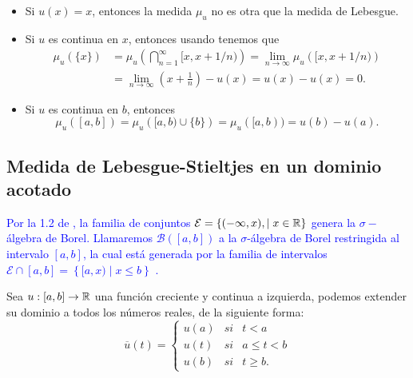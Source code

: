 %

\begin{obs} \vphantom{a}
	\begin{itemize} 
		\item Si $u(x)=x$, entonces la medida $\mu_{u}$ no es otra que la medida de Lebesgue.
		\item Si $u$ es continua   en $x$, entonces usando  \cite[Teorema 3.28]{Zo} tenemos que 		
		\begin{equation*}
            \begin{split}
			\mu_{u}(\{x\})&=\mu_{u}\left( \bigcap_{n=1}^{\infty}[x,x+1/n)\right) =\lim_{n \to \infty}\mu_{u}\left([x,x+1/n)\right)
			\\ &=\lim_{n \to \infty}\left(x+\frac{1}{n}\right)-u(x)=u(x)-u(x)=0.
            \end{split}
		\end{equation*}
		
		\item  Si $u$ es continua  en $b$, entonces 
		$$\mu_{u}([a,b])=\mu_{u}\left([a,b) \cup\{b\}\right)=\mu_{u}([a,b))=u(b)-u(a).$$		
	\end{itemize}
\end{obs}

\subsection{Medida de  Lebesgue-Stieltjes en un dominio acotado}

\textcolor{blue}{ Por la  1.2 de \cite{folland}, la familia de conjuntos $\mathcal{E}=\{(-\infty,x),\mid x\in\mathbb{R}\}$ genera la $\sigma-$álgebra de Borel. Llamaremos $\mathscr{B}([a,b])$  a la $\sigma$-álgebra de Borel restringida al intervalo $[a,b]$, la cual  está generada por la familia de intervalos $\mathcal{E}\cap [a,b]=\left\lbrace [a,x) \mid x\leq b\right\rbrace $ .}
 
 
Sea $u:[a,b]\to\mathbb{R}$ una función  creciente y continua a izquierda, podemos extender su dominio a todos los números reales, de la siguiente forma:
$$\overline{u}(t)=\left\lbrace \begin{array}{rll}
	u(a) &si & t<a\\
	u(t) & si & a\leq t < b\\
	u(b)& si & t\geq b.
\end{array}\right. $$ 

